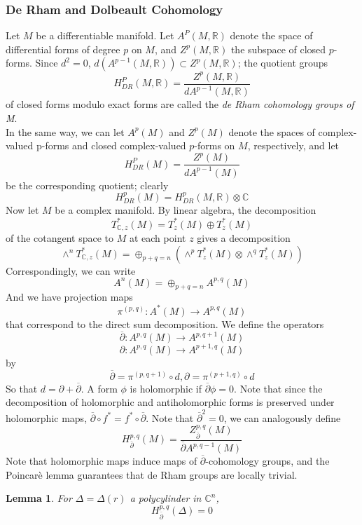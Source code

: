 \documentclass{article}
\newtheorem{lem}{Lemma}
\begin{document}
\subsubsection{De Rham and Dolbeault Cohomology}

\indent Let $M$ be a differentiable manifold. Let $A^P(M, \mathbb{R})$ denote the space of differential forms of degree $p$ on $M$, and $Z^p(M, \mathbb{R})$ the subspace of closed $p$-forms. Since $d^2 = 0$, $d( A^{p-1}(M, \mathbb{R})) \subset Z^p(M, \mathbb{R})$; the quotient groups
\[
	H^P_{DR}(M, \mathbb{R}) = \frac{Z^p(M, \mathbb{R})}{dA^{p-1}(M, \mathbb{R})}
\]
of closed forms modulo exact forms are called the \textit{de Rham cohomology groups of M}. \\
\indent In the same way, we can let $A^p(M)$ and $Z^p(M)$ denote the spaces of complex-valued p-forms and closed complex-valued $p$-forms on $M$, respectively, and let
\[
	H^P_{DR}(M) = \frac{Z^p(M)}{dA^{p-1}(M)}
\]
be the corresponding quotient; clearly
\[
	H^p_{DR}(M) = H^p_{DR}(M, \mathbb{R}) \otimes \mathbb{C}
\]
\indent Now let $M$ be a complex manifold. By linear algebra, the decomposition
\[
	T^*_{ \mathbb{C},z}(M) = T^*_z (M) \oplus T^*_z (M)
\]
of the cotangent space to $M$ at each point $z$ gives a decomposition
\[
	\wedge^n T^*_{ \mathbb{C},z} (M) = \oplus_{p+q = n} \left( \wedge^p T^*_z(M) \otimes \wedge^q T^*_z (M) \right) 
\]
Correspondingly, we can write
\[
	A^n(M) = \oplus_{p+q = n} A^{p,q}(M)
\]
And we have projection maps
\[
	\pi^{(p,q)}: A^*(M) \to A^{p,q}(M)
\]
that correspond to the direct sum decomposition. We define the operators
\[
	\overline{\partial}: A^{p,q}(M) \to A^{p, q+1}(M)
\]
\[
	\partial: A^{p,q}(M) \to A^{p+1,q}(M)
\]
by
\[
	\overline{\partial} = \pi^{(p,q+1)} \circ d, \partial = \pi^{(p+1,q)} \circ d
\]
So that $d = \partial + \overline{\partial}$. A form $\phi$ is holomorphic if $\overline{\partial} \phi = 0$. Note that since the decomposition of holomorphic and antiholomorphic forms is preserved under holomorphic maps, $ \overline{\partial} \circ f^* = f^* \circ \overline{\partial}$. Note that $ \overline{\partial}^2 = 0$, we can analogously define
\[
	H^{p,q}_{ \overline{\partial} } (M) =  \frac{Z^{p,q}_{ \overline{\partial} }(M)}{ \overline{\partial} A^{p, q-1} (M) }
\]
Note that holomorphic maps induce maps of $ \overline{\partial}$-cohomology groups, and the Poincar\`e lemma guarantees that de Rham groups are locally trivial.


\begin{lem}

	For $\Delta = \Delta(r)$ a polycylinder in $ \mathbb{C}^n$,
	\[
		H^{p,q}_{ \overline{\partial} } (\Delta) = 0
	\]
	

\end{lem}
\end{document}
